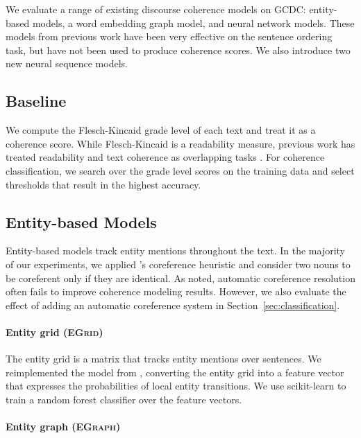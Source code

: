 \documentclass[11pt,a4paper]{article}
\newcommand \egrid{\textsc{EGrid}\xspace}
\newcommand \egraph{\textsc{EGraph}\xspace}
\newcommand \dataset{\textsc{GCDC}\xspace}
\begin{document}
We evaluate a range of existing discourse coherence models on \dataset: entity-based models, a word embedding graph model, and neural network models. These models from previous work have been very effective on the sentence ordering task, but have not been used to produce coherence scores. We also introduce two new neural sequence models. 


\subsection{Baseline}

We compute the Flesch-Kincaid grade level \cite{Flesch} of each text and treat it as a coherence score. While Flesch-Kincaid is a readability measure, previous work has treated readability and text coherence as overlapping tasks \cite{barzilay_CL_2008,mesgar-strube:2015:*SEM2015}. For coherence classification, we search over the grade level scores on the training data and select thresholds that result in the highest accuracy. 



\subsection{Entity-based Models}

Entity-based models track entity mentions throughout the text.  
In the majority of our experiments, we applied \citet{barzilay_CL_2008}'s coreference heuristic and consider two nouns to be coreferent only if they are identical. As \citet{elsner-charniak:2011:ACL} noted, automatic coreference resolution often fails to improve coherence modeling results. However, we also evaluate the effect of adding an automatic coreference system in Section~\ref{sec:classification}. 


\paragraph{Entity grid (\egrid)}

The entity grid \cite{barzilay-lapata:2005:ACL} is a matrix that tracks entity mentions over sentences. We reimplemented the model from \citet{barzilay_CL_2008}, converting the entity grid into a feature vector that expresses the probabilities of local entity transitions. We use scikit-learn \cite{scikit-learn} to train a random forest classifier over the feature vectors.


\paragraph{Entity graph (\egraph)}
\end{document}
